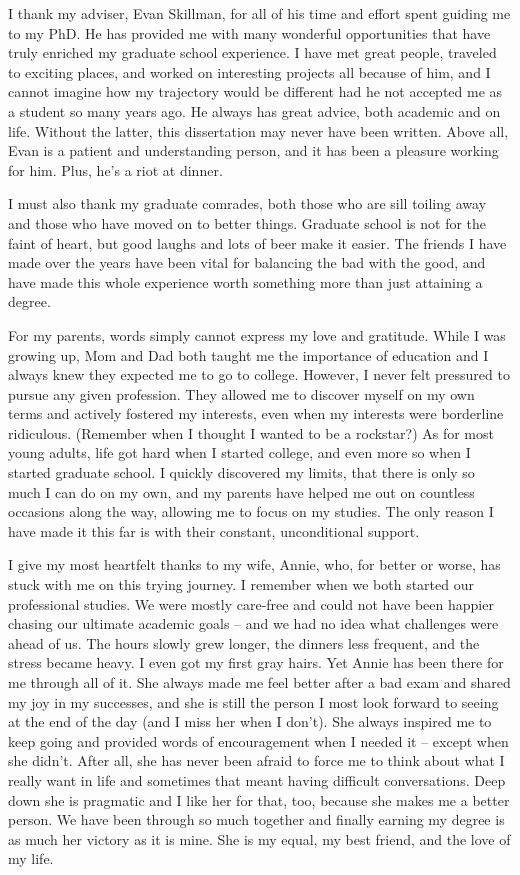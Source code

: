 I thank my adviser, Evan Skillman, for all of his time and effort spent guiding
me to my PhD. He has provided me with many wonderful opportunities that have
truly enriched my graduate school experience. I have met great people, traveled
to exciting places, and worked on interesting projects all because of him, and
I cannot imagine how my trajectory would be different had he not accepted me as
a student so many years ago. He always has great advice, both academic and on
life. Without the latter, this dissertation may never have been written. Above
all, Evan is a patient and understanding person, and it has been a pleasure
working for him. Plus, he's a riot at dinner.

I must also thank my graduate comrades, both those who are sill toiling away
and those who have moved on to better things. Graduate school is not for the
faint of heart, but good laughs and lots of beer make it easier. The friends I
have made over the years have been vital for balancing the bad with the good,
and have made this whole experience worth something more than just attaining a
degree.

For my parents, words simply cannot express my love and gratitude. While I was
growing up, Mom and Dad both taught me the importance of education and I always
knew they expected me to go to college. However, I never felt pressured to
pursue any given profession. They allowed me to discover myself on my own terms
and actively fostered my interests, even when my interests were borderline
ridiculous. (Remember when I thought I wanted to be a rockstar?) As for most
young adults, life got hard when I started college, and even more so when I
started graduate school. I quickly discovered my limits, that there is only so
much I can do on my own, and my parents have helped me out on countless
occasions along the way, allowing me to focus on my studies. The only reason I
have made it this far is with their constant, unconditional support.

I give my most heartfelt thanks to my wife, Annie, who, for better or worse,
has stuck with me on this trying journey. I remember when we both started our
professional studies. We were mostly care-free and could not have been happier
chasing our ultimate academic goals -- and we had no idea what challenges were
ahead of us. The hours slowly grew longer, the dinners less frequent, and the
stress became heavy. I even got my first gray hairs. Yet Annie has been there
for me through all of it. She always made me feel better after a bad exam and
shared my joy in my successes, and she is still the person I most look forward
to seeing at the end of the day (and I miss her when I don't). She always
inspired me to keep going and provided words of encouragement when I needed it
-- except when she didn't. After all, she has never been afraid to force me to
think about what I really want in life and sometimes that meant having
difficult conversations. Deep down she is pragmatic and I like her for that,
too, because she makes me a better person. We have been through so much
together and finally earning my degree is as much her victory as it is mine.
She is my equal, my best friend, and the love of my life.
